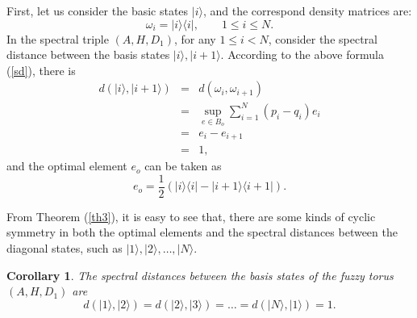 \documentclass[a4paper,11pt]{article}
\newtheorem{corollary}{Corollary}
\begin{document}
First, let us consider the basic states $|i \rangle$, and the correspond density matrices are:
\begin{equation}
  \omega_i = |i \rangle \langle i|, \qquad 1\leqslant i \leqslant N.
\end{equation}
In the spectral triple $(A, H, D_1)$, for any $1 \leqslant i < N$, consider
the spectral distance between the basis states $|i \rangle, |i + 1 \rangle$. According to the above formula (\ref{sd}), there is
\begin{eqnarray}
  d (|i \rangle, |i + 1 \rangle) & = & d (\omega_i, \omega_{i + 1})
  \nonumber\\
  & = & \sup_{e \in B_o} \sum_{i = 1}^N (p_i - q_i) e_i
  \nonumber\\
  & = & e_i - e_{i + 1} \nonumber\\
  & = & 1, 
\end{eqnarray}
and the optimal element $e_o$ can be taken as
\begin{equation}
  e_o = \frac{1}{2} (|i \rangle \langle i| - |i + 1 \rangle  \langle
  i + 1|) .
\end{equation}

From Theorem (\ref{th3}), it is easy to see that, there are some kinds of cyclic symmetry in both the optimal elements and the spectral distances between the diagonal states, such as $|1 \rangle, |2 \rangle, \ldots, |N \rangle$.

\begin{corollary}
  The spectral distances between the basis states of the fuzzy torus $(A, H,
  D_1)$ are
  \begin{equation}
    d (|1 \rangle, |2 \rangle) = d (|2 \rangle, |3 \rangle) = \ldots = d (|N
    \rangle, |1 \rangle) = 1.
  \end{equation}
\end{corollary}
\end{document}
